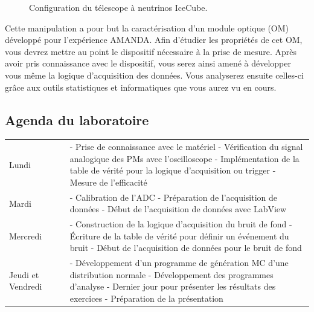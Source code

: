 \begin{figure}
    \caption{\label{fig:IceCube} Configuration du télescope à neutrinos IceCube.}
\end{figure}

Cette manipulation a pour but la caractérisation d'un module optique (OM) développé pour l'expérience AMANDA. Afin d'étudier les propriétés de cet OM, vous devrez mettre au point le dispositif nécessaire à la prise de mesure. Après avoir pris connaissance avec le dispositif, vous serez ainsi amené à développer vous même la logique d'acquisition des données. Vous analyserez ensuite celles-ci grâce aux outils statistiques et informatiques que vous aurez vu en cours. 

\subsection{Agenda du laboratoire}
\begin{tabular}{p{0.2\linewidth} p{0.8\linewidth}}
Lundi & - Prise de connaissance avec le matériel\newline
		- Vérification du signal analogique des PMs avec l'oscilloscope\newline
		- Implémentation de la table de vérité pour la logique d'acquisition ou trigger\newline
		- Mesure de l'efficacité\\

Mardi & - Calibration de l'ADC\newline
		- Préparation de l'acquisition de données\newline
		- Début de l'acquisition de données avec LabView\\

Mercredi & - Construction de la logique d'acquisition du bruit de fond\newline
		- Écriture de la table de vérité pour définir un événement du bruit\newline
		- Début de l'acquisition de données pour le bruit de fond\\

Jeudi et Vendredi & - Développement d'un programme de génération MC d'une distribution normale\newline
		- Développement des programmes d'analyse\newline
		- Dernier jour pour présenter les résultats des exercices\newline
		- Préparation de la présentation\newline
\end{tabular} 

